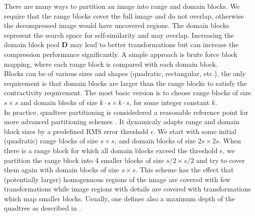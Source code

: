 There are many ways to partition an image into range and domain blocks. We require that the range blocks cover the full image and do not overlap, otherwise the
decompressed image would have uncovered regions. The domain blocks represent the search space for self-similarity and may overlap. 
Increasing the domain block pool $\boldsymbol{D}$ may lead to better transformations but can increase the compression performance significantly.
A simple approach is brute force block mapping, where each range block is compared with each domain block.\\
Blocks can be of various sizes and shapes (quadratic, rectangular, etc.), the only requirement is that domain blocks are larger than the range blocks to satisfy the
contractivity requirement. The most basic version is to choose range blocks of size $s \times s$ and domain blocks of size $k\cdot s \times k \cdot s$, for some
integer constant $k$.\\
In practice, quadtree partitioning is considedered a reasonable reference point for more advanced partitioning schemes \cite{fisher2012}. 
It dynamicaly adapts range and domain block sizes by a predefined RMS error threshold $\epsilon$. 
We start with some initial (quadratic) range blocks of size $s \times s$, and domain blocks of size $2s \times 2s$. 
When there is a range block for which all domain blocks exceed the threshold $\epsilon$, we partition
the range block into 4 smaller blocks of size $s/2 \times s/2$ and try to cover them again with domain blocks of size $s \times s$.
This scheme has the effect that (potentially larger) homogenuous regions of the image are covered with few transformations while image
regions with details are covered with transformations which map smaller blocks. 
Usually, one defines also a maximum depth of the quadtree as described in \cite{fisher2012}.


